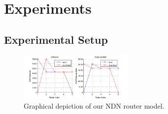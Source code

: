 \section{Experiments}
\label{sec:experiments}

\subsection{Experimental Setup}
\label{subsec:exp-setup}

\begin{figure}[h!]

    \centering
    \includegraphics[width=0.50\textwidth]{figures/pre-test.png}
    \cprotect\caption{Graphical depiction of our NDN router model.}
    \label{fig:pre-test}

\end{figure}


